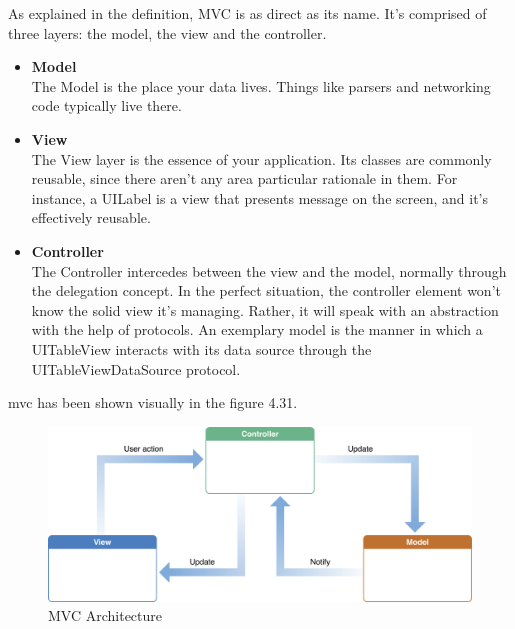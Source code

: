 
As explained in the definition, MVC is as direct as its name. It's comprised of three layers: the model, the view and the controller.

\begin{itemize}
    \item \textbf{Model} \\
    The Model is the place your data lives. Things like parsers and networking code typically live there. \\
    
    \item \textbf{View} \\
    The View layer is the essence of your application. Its classes are commonly reusable, since there aren't any area particular rationale in them. For instance, a UILabel is a view that presents message on the screen, and it's effectively reusable. \\
    
    \newpage
    
    \item \textbf{Controller} \\
    The Controller intercedes between the view and the model, normally through the delegation concept. In the perfect situation, the controller element won't know the solid view it's managing. Rather, it will speak with an abstraction with the help of protocols. An exemplary model is the manner in which a UITableView interacts with its data source through the UITableViewDataSource protocol. \\
    
\end{itemize}


\gls{mvc} has been shown visually in the figure 4.31.

    \begin{figure}[H]
            \centering
            \includegraphics[width=1.0\linewidth]{figures/ch4/mvc.png}
            \caption{\label{fig:mvc} MVC Architecture}
        \end{figure}

